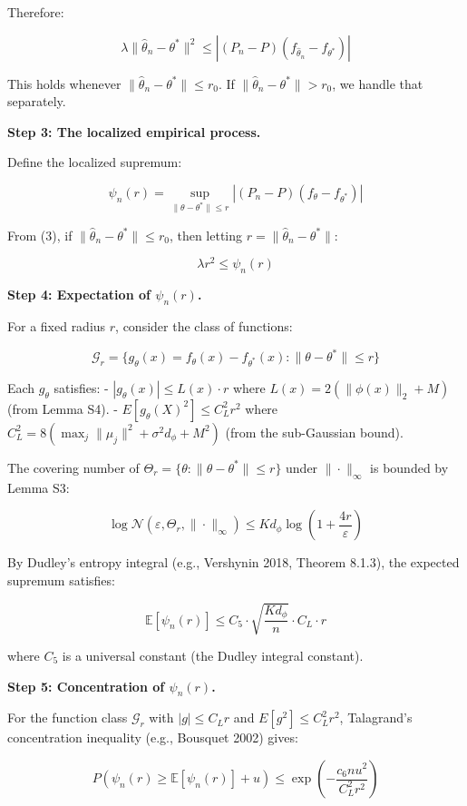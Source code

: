 \documentclass[
  12pt,
]{ctexart}
\begin{document}
Therefore:

\[\lambda \|\hat{\theta}_n - \theta^*\|^2 \leq |(P_n-P)(f_{\hat{\theta}_n} - f_{\theta^*})| \tag{3}\]

This holds whenever \(\|\hat{\theta}_n - \theta^*\| \leq r_0\). If
\(\|\hat{\theta}_n - \theta^*\| > r_0\), we handle that separately.

\textbf{Step 3: The localized empirical process.}

Define the localized supremum:

\[\psi_n(r) = \sup_{\|\theta - \theta^*\| \leq r} |(P_n-P)(f_\theta - f_{\theta^*})|\]

From (3), if \(\|\hat{\theta}_n - \theta^*\| \leq r_0\), then letting
\(r = \|\hat{\theta}_n - \theta^*\|\):

\[\lambda r^2 \leq \psi_n(r) \tag{4}\]

\textbf{Step 4: Expectation of \(\psi_n(r)\).}

For a fixed radius \(r\), consider the class of functions:

\[\mathcal{G}_r = \{g_\theta(x) = f_\theta(x) - f_{\theta^*}(x) : \|\theta - \theta^*\| \leq r\}\]

Each \(g_\theta\) satisfies: - \(|g_\theta(x)| \leq L(x) \cdot r\) where
\(L(x) = 2(\|\phi(x)\|_2 + M)\) (from Lemma S4). -
\(E[g_\theta(X)^2] \leq C_L^2 r^2\) where
\(C_L^2 = 8(\max_j \|\mu_j\|^2 + \sigma^2 d_\phi + M^2)\) (from the
sub-Gaussian bound).

The covering number of
\(\Theta_r = \{\theta : \|\theta - \theta^*\| \leq r\}\) under
\(\|\cdot\|_\infty\) is bounded by Lemma S3:

\[\log \mathcal{N}(\varepsilon, \Theta_r, \|\cdot\|_\infty) \leq K d_\phi \log\left(1 + \frac{4r}{\varepsilon}\right)\]

By Dudley's entropy integral (e.g., Vershynin 2018, Theorem 8.1.3), the
expected supremum satisfies:

\[\mathbb{E}[\psi_n(r)] \leq C_5 \cdot \sqrt{\frac{K d_\phi}{n}} \cdot C_L \cdot r \tag{5}\]

where \(C_5\) is a universal constant (the Dudley integral constant).

\textbf{Step 5: Concentration of \(\psi_n(r)\).}

For the function class \(\mathcal{G}_r\) with \(|g| \leq C_L r\) and
\(E[g^2] \leq C_L^2 r^2\), Talagrand's concentration inequality (e.g.,
Bousquet 2002) gives:

\[P\left(\psi_n(r) \geq \mathbb{E}[\psi_n(r)] + u\right) \leq \exp\left(-\frac{c_6 n u^2}{C_L^2 r^2}\right) \tag{6}\]
\end{document}
